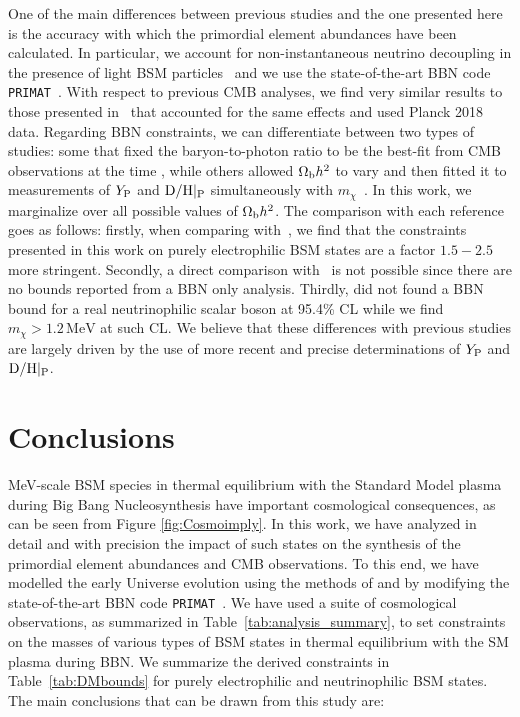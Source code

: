 One of the main differences between previous studies and the one presented here is the accuracy with which the primordial element abundances have been calculated. In particular, we account for non-instantaneous neutrino decoupling in the presence of light BSM particles~\cite{Escudero:2018mvt,Escudero:2019new} and we use the state-of-the-art BBN code \texttt{PRIMAT}~\cite{Pitrou:2018cgg}. With respect to previous CMB analyses, we find very similar results to those presented in~\cite{Escudero:2018mvt} that accounted for the same effects and used Planck 2018 data. Regarding BBN constraints, we can differentiate between two types of studies: some that fixed the baryon-to-photon ratio to be the best-fit from CMB observations at the time \cite{Serpico:2004nm,Boehm:2013jpa,Boehm:2012gr,Depta:2019lbe}, while others allowed $\Omega_{\rm b}h^2$ to vary and then fitted it to measurements of $Y_{\rm P}$ and ${\rm D/H}|_{\rm P}$ simultaneously with $m_\chi$~\cite{Nollett:2013pwa,Nollett:2014lwa,Wilkinson:2016gsy}. In this work, we marginalize over all possible values of $\Omega_{\rm b}h^2$. The comparison with each reference goes as follows: firstly, when comparing with~\cite{Nollett:2013pwa}, we find that the constraints presented in this work on purely electrophilic BSM states are a factor $1.5-2.5$ more stringent. Secondly, a direct comparison with~\cite{Nollett:2014lwa} is not possible since there are no bounds reported from a BBN only analysis. Thirdly, \cite{Wilkinson:2016gsy} did not found a BBN bound for a real neutrinophilic scalar boson at 95.4\% CL while we find $m_\chi > 1.2\,\text{MeV}$ at such CL. We believe that these differences with previous studies are largely driven by the use of more recent and precise determinations of $Y_{\rm P}$ and ${\rm D/H}|_{\rm P}$.


\section{Conclusions}\label{sec:conclusions}

MeV-scale BSM species in thermal equilibrium with the Standard Model plasma during Big Bang Nucleosynthesis have important cosmological consequences, as can be seen from Figure \ref{fig:Cosmoimply}. In this work, we have analyzed in detail and with precision the impact of such states on the synthesis of the primordial element abundances and CMB observations. To this end, we have modelled the early Universe evolution using the methods of \cite{Escudero:2018mvt,Escudero:2019new} and by modifying the state-of-the-art BBN code \texttt{PRIMAT}~\cite{Pitrou:2018cgg}. We have used a suite of cosmological observations, as summarized in Table~\ref{tab:analysis_summary}, to set constraints on the masses of various types of BSM states in thermal equilibrium with the SM plasma during BBN. We summarize the derived constraints in Table~\ref{tab:DMbounds} for purely electrophilic and neutrinophilic BSM states. The main conclusions that can be drawn from this study are:
 
